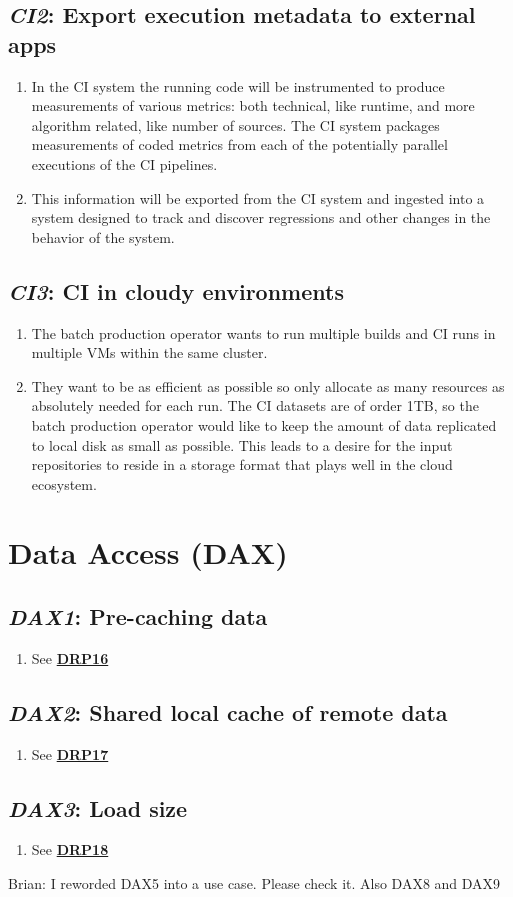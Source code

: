 \documentclass[DM,toc,lsstdraft]{lsstdoc}
\newcommand{\usecase}[3]{%
\subsection{\emph{#1}: #2}
\label{use:#1}
\begin{enumerate}[label=\alph*.]
#3
\end{enumerate}
}
\newcommand{\useref}[1]{\hyperref[use:#1]{\textcolor{lsstblue}{\textbf{#1}}}}
\begin{document}
\usecase{CI2}{Export execution metadata to external apps}{%

\item
In the CI system the running code will be instrumented to produce measurements of various metrics: both technical, like runtime, and more algorithm related, like number of sources.
The CI system packages measurements of coded metrics from each of the potentially parallel executions of the CI pipelines.

\item
This information will be exported from the CI system and ingested into a system designed to track and discover regressions and other changes in the behavior of the system.

}

\usecase{CI3}{CI in cloudy environments}{%

\item
The batch production operator wants to run multiple builds and CI runs in multiple VMs within the same cluster.

\item
They want to be as efficient as possible so only allocate as many resources as absolutely needed for each run.
The CI datasets are of order 1TB, so the batch production operator would like to keep the amount of data replicated to local disk as small as possible.
This leads to a desire for the input repositories to reside in a storage format that plays well in the cloud ecosystem.

}

\section{Data Access (DAX)}

\usecase{DAX1}{Pre-caching data}{%

\item
See \useref{DRP16}

}

\usecase{DAX2}{Shared local cache of remote data}{%

\item
See \useref{DRP17}

}

\usecase{DAX3}{Load size}{%

\item
See \useref{DRP18}

}

\begin{draftnote}
  Brian: I reworded DAX5 into a use case. Please check it. Also DAX8 and DAX9
\end{draftnote}
\end{document}

